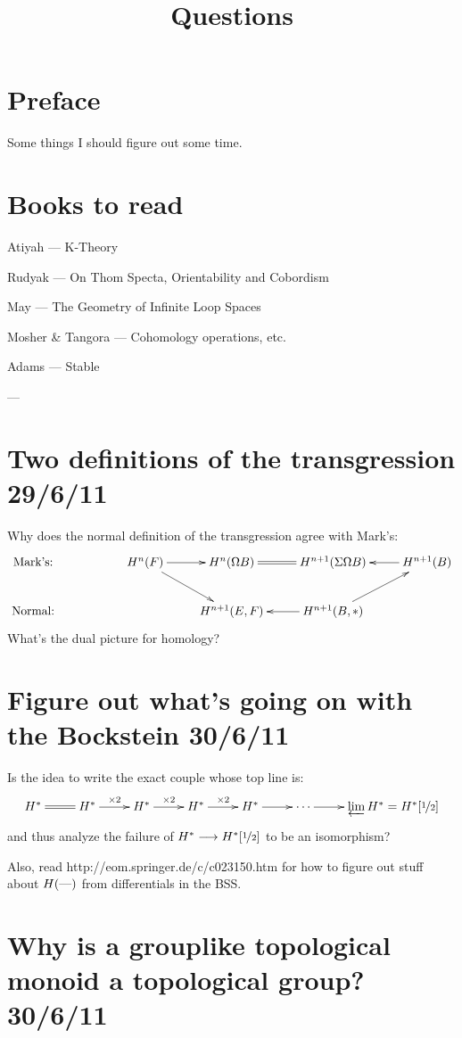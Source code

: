 \documentclass[11pt]{article}
\title{Questions}
\author{}
\date{}
\begin{document}
\newcommand{\HSsection}[2]{\section*{#1 \hfill \small{#2}}}

\HSsection{Preface}{}
Some things I should figure out some time.

\HSsection{Books to read}{}
\newcommand{\BooK}[2]{\item #1 --- #2}
\begin{itemise}
\BooK{Atiyah}{K-Theory}
\BooK{Rudyak}{On Thom Specta, Orientability and Cobordism}
\BooK{May}{The Geometry of Infinite Loop Spaces}
\BooK{Mosher \& Tangora}{Cohomology operations, etc.}
\BooK{Adams}{Stable }
\BooK{}{}
\end{itemise}

\HSsection{Two definitions of the transgression}{29/6/11}
Why does the normal definition of the transgression agree with Mark's:
\[\xymatrix{
\text{Mark's:}&&\ar[dr]H^n(F)\ar[r]& H^n(\Omega B)\ar@{=}[r]&H^{n+1}(\Sigma\Omega B)&\ar[l] H^{n+1}(B)\\
\text{Normal:}&&&H^{n+1}(E,F)&H^{n+1}(B,*)\ar[ru]\ar[l]
}\]
What's the dual picture for homology?
\HSsection{Figure out what's going on with the Bockstein}{30/6/11}
Is the idea to write the exact couple whose top line is:
\[\xymatrix{
H^*\ar@{=}[r]&H^*\ar[r]^{\times2}&H^*\ar[r]^{\times2}&H^*\ar[r]^{\times2}&H^*\ar[r]&\cdots\ar[r]&\varprojlim H^*=H^*[\nicefrac{1}{2}]
}\]
and thus analyze the failure of $H^*\to H^*[\nicefrac{1}{2}]$ to be an isomorphism?

Also, read http://eom.springer.de/c/c023150.htm for how to figure out stuff about $H(\DASH)$ from differentials in the BSS.
\HSsection{Why is a grouplike topological monoid a topological group?}{30/6/11}
\end{document}
